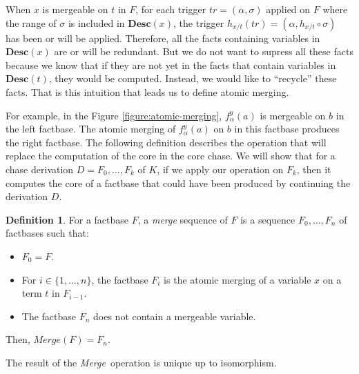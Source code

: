\documentclass{article}
\theoremstyle{definition}
\newtheorem{definition}{Definition}[section]
\theoremstyle{remark}
\newcommand{\tr}{\textit{tr}}
\newcommand{\Merge}{\textit{Merge}}
\newcommand{\des}{\textbf{Desc}}
\begin{document}
When $x$ is mergeable on $t$ in $F$, for each trigger $\tr=(\alpha,\sigma)$ applied on $F$ where the range of $\sigma$ is included in $\des(x)$, the trigger $h_{x/t}(\tr)= (\alpha,h_{x/t} \circ \sigma)$ has been or will be applied. Therefore, all the facts containing variables in $\des(x)$ are or will be redundant. But we do not want to supress all these facts because we know that if they are not yet in the facts that contain variables in $\des(t)$, they would be computed. Instead, we would like to ``recycle'' these facts. That is this intuition that leads us to define atomic merging. 



For example, in the Figure \ref{figure:atomic-merging}, $f_\alpha^y(a)$ is mergeable on $b$ in the left factbase. The atomic merging of $f_\alpha^y(a)$ on $b$ in this factbase produces the right factbase. The following definition describes the operation that will replace the computation of the core in the core chase. We will show that for a chase derivation $D =F_0,...,F_k$ of $K$, if we apply our operation on $F_k$, then it computes the core of a factbase that could have been produced by continuing the derivation $D$.



\begin{definition}
For a factbase $F$, a \emph{merge} sequence of $F$ is a sequence $F_0,\ldots,F_n$ of factbases such that:
\begin{itemize}
\item $F_0 = F$.
\item For $i \in \{1,\ldots,n\}$, the factbase $F_i$ is the atomic merging of a variable $x$ on a term $t$ in $F_{i-1}$.
\item The factbase $F_n$ does not contain a mergeable variable.
\end{itemize}
Then, $\Merge(F) = F_n$.
\end{definition}

The result of the \Merge\ operation is unique up to isomorphism. 
\end{document}

